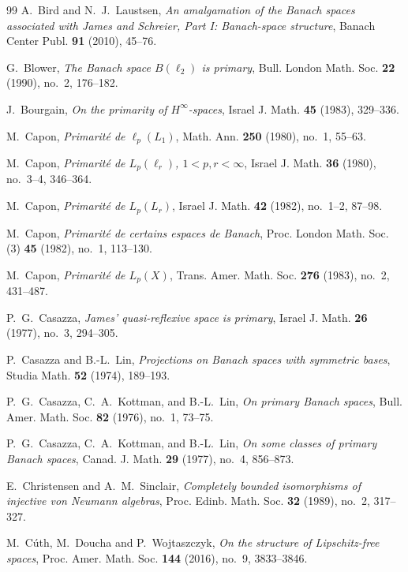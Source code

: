 \documentclass[11pt]{amsart}
\theoremstyle{plain}
\theoremstyle{definition}
\numberwithin{equation}{section}
\begin{document}
\begin{thebibliography}{99}
A.~Bird and N.~J.~Laustsen,
\emph{An amalgamation of the Banach spaces associated with James and Schreier, Part I: Banach-space structure},
Banach Center Publ. \textbf{91} (2010), 45--76.

G.~Blower,
\emph{The Banach space $B(\ell_2)$ is primary},
Bull. London Math. Soc. \textbf{22} (1990), no.~2, 176--182.

J.~Bourgain,
\emph{On the primarity of $H^\infty$-spaces},
Israel J. Math. \textbf{45} (1983), 329--336.

M.~Capon,
\emph{Primarit\'e de $\ell_p(L_1)$},
Math. Ann. \textbf{250} (1980), no.~1, 55--63.

M.~Capon,
\emph{Primarit\'e de $L_p(\ell_r)$, $1<p,r<\infty$},
Israel J. Math. \textbf{36} (1980), no.~3--4, 346--364.

M.~Capon,
\emph{Primarit\'e de $L_p(L_r)$},
Israel J. Math. \textbf{42} (1982), no.~1--2, 87--98.

M.~Capon,
\emph{Primarit\'e de certains espaces de Banach},
Proc. London Math. Soc. (3) \textbf{45} (1982), no.~1, 113--130.

M.~Capon,
\emph{Primarit\'e de $L_p(X)$},
Trans. Amer. Math. Soc. \textbf{276} (1983), no.~2, 431--487.

P.~G.~Casazza,
\emph{James' quasi-reflexive space is primary},
Israel J. Math. \textbf{26} (1977), no.~3, 294--305.

P.~Casazza and B.-L.~Lin,
\emph{Projections on Banach spaces with symmetric bases},
Studia Math. \textbf{52} (1974), 189--193.

P.~G.~Casazza, C.~A.~Kottman, and B.-L.~Lin,
\emph{On primary Banach spaces},
Bull. Amer. Math. Soc. \textbf{82} (1976), no.~1, 73--75.

P.~G.~Casazza, C.~A.~Kottman, and B.-L.~Lin,
\emph{On some classes of primary Banach spaces},
Canad. J. Math. \textbf{29} (1977), no.~4, 856--873.

E.~Christensen and A.~M.~Sinclair,
\emph{Completely bounded isomorphisms of injective von Neumann algebras},
Proc. Edinb. Math. Soc. \textbf{32} (1989), no.~2, 317--327.

M.~C\'uth, M.~Doucha and P.~Wojtaszczyk,
\emph{On the structure of Lipschitz-free spaces},
Proc. Amer. Math. Soc. \textbf{144} (2016), no.~9, 3833--3846.


\end{thebibliography}
\end{document}
